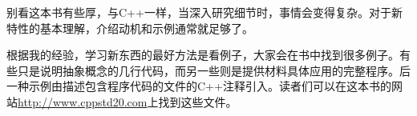 别看这本书有些厚，与C++一样，当深入研究细节时，事情会变得复杂。对于新特性的基本理解，介绍动机和示例通常就足够了。

根据我的经验，学习新东西的最好方法是看例子，大家会在书中找到很多例子。有些只是说明抽象概念的几行代码，而另一些则是提供材料具体应用的完整程序。后一种示例由描述包含程序代码的文件的C++注释引入。读者们可以在这本书的网站\url{http://www.cppstd20.com}上找到这些文件。
